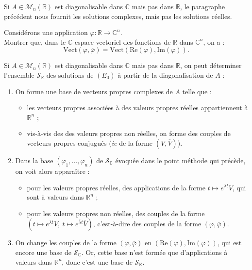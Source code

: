 \documentclass[french]{article}
\newcommand{\R}{\mathbb{R}}
\newcommand{\C}{\mathbb{C}}
\newcommand{\Vect}{\text{Vect}}
\theoremstyle{plain}
\theoremstyle{definition}
\theoremstyle{remark}
\begin{document}
Si $A\in\mathcal{M}_n(\R)$ est diagonalisable dans $\C$ mais pas dans $\R$, le paragraphe précédent nous fournit les solutions complexes, mais pas les solutions réelles.

\begin{exo}
	Considérons une application $\varphi:\R\to\C^n$.\\
	Montrer que, dans le $\C$-espace vectoriel des fonctions de $\R$ dans $\C^n$, on a :
	$$\Vect(\varphi,\overline{\varphi})=\Vect(\text{Re}(\varphi),\text{Im}(\varphi)).$$
\end{exo}

\begin{met}
	Si $A\in\mathcal{M}_n(\R)$ est diagonalisable dans $\C$ mais pas dans $\R$, on peut déterminer l'ensemble $\mathcal{S}_\R$ des solutions de $(E_0)$ à partir de la diagonalisation de $A$ :
	\begin{enumerate}
		\item On forme une base de vecteurs propres complexes de $A$ telle que :
		\begin{itemize}
			\item les vecteurs propres associées à des valeurs propres réelles appartiennent à $\R^n$ ;
			\item vis-à-vis des des valeurs propres non réelles, on forme des couples de vecteurs propres conjugués (\textit{ie} de la forme $(V,\overline{V})$).
		\end{itemize}
		\item Dans la base $(\varphi_1,\ldots,\varphi_n)$ de $\mathcal{S}_\C$ évoquée dans le point méthode qui précède, on voit alors apparaître :
		\begin{itemize}
			\item pour les valeurs propres réelles, des applications de la forme $t\mapsto e^{\lambda t}V$, qui sont à valeurs dans $\R^n$ ;
			\item pour les valeurs propres non réelles, des couples de la forme $(t\mapsto e^{\lambda t}V,\ t\mapsto e^{\overline{\lambda} t}\overline{V})$, c'est-à-dire des couples de la forme $(\varphi,\overline{\varphi})$.
		\end{itemize}
		\item On change les couples de la forme $(\varphi,\overline{\varphi})$ en $(\text{Re}(\varphi),\text{Im}(\varphi))$, qui est encore une base de $\mathcal{S}_\C$. Or, cette base n'est formée que d'applications à valeurs dans $\R^n$, donc c'est une base de $\mathcal{S}_\R$.
	\end{enumerate}
\end{met}
\end{document}
